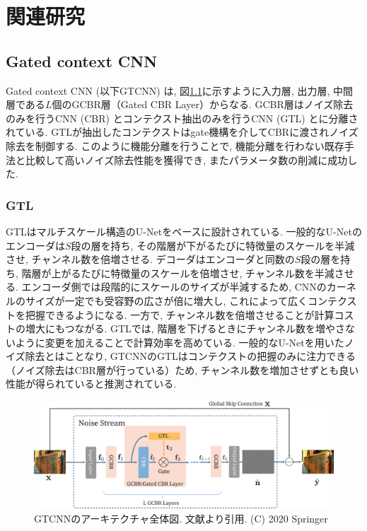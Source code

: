 \chapter{関連研究}

\section{Gated context CNN}
Gated context CNN (以下GTCNN) は, 図\ref{fig:GTCNN_overall}に示すように入力層, 出力層, 中間層である$L$個のGCBR層（Gated CBR Layer）からなる. GCBR層はノイズ除去のみを行うCNN (CBR) とコンテクスト抽出のみを行うCNN (GTL) とに分離されている. GTLが抽出したコンテクストはgate機構を介してCBRに渡されノイズ除去を制御する. このように機能分離を行うことで, 機能分離を行わない既存手法と比較して高いノイズ除去性能を獲得でき, またパラメータ数の削減に成功した. 


\subsection{GTL}
GTLはマルチスケール構造のU-Net\cite{U-net}をベースに設計されている. 一般的なU-Netのエンコーダは$S$段の層を持ち, その階層が下がるたびに特徴量のスケールを半減させ, チャンネル数を倍増させる. デコーダはエンコーダと同数の$S$段の層を持ち, 階層が上がるたびに特徴量のスケールを倍増させ, チャンネル数を半減させる. エンコーダ側では段階的にスケールのサイズが半減するため, CNNのカーネルのサイズが一定でも受容野の広さが倍に増大し, これによって広くコンテクストを把握できるようになる. 一方で, チャンネル数を倍増させることが計算コストの増大にもつながる. GTLでは, 階層を下げるときにチャンネル数を増やさないように変更を加えることで計算効率を高めている. 一般的なU-Netを用いたノイズ除去とはことなり, GTCNNのGTLはコンテクストの把握のみに注力できる（ノイズ除去はCBR層が行っている）ため, チャンネル数を増加させずとも良い性能が得られていると推測されている. 


\begin{figure}[ht]
\centering
\includegraphics[scale=0.13]{figures/GTCNN_overall.pdf}
\caption{GTCNNのアーキテクチャ全体図. 文献\cite{GTCNN}より引用. (C) 2020 Springer　\label{fig:GTCNN_overall}}
\end{figure}

